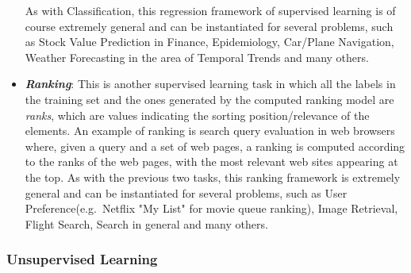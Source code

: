 \begin{itemize}
            As with Classification, this regression framework of
            supervised learning is of course extremely general
            and can be instantiated for several problems, such as
            Stock Value Prediction in Finance, Epidemiology, Car/Plane
            Navigation, Weather Forecasting in the area of Temporal
            Trends and many others.

      \item \emph{\textbf{Ranking}}: This is another supervised learning
            task in which all the labels in the training set and the ones
            generated by the computed ranking model are \emph{ranks},
            which are values indicating the sorting position/relevance
            of the elements. An example of ranking is search query
            evaluation in web browsers where, given a query and a set of
            web pages, a ranking is computed according to the ranks of
            the web pages, with the most relevant web sites appearing at
            the top. As with the previous two tasks, this ranking
            framework is extremely general and can be instantiated for
            several problems, such as User Preference(e.g.\ Netflix
            "My List" for movie queue ranking), Image Retrieval, Flight
            Search, Search in general and many others.
\end{itemize}

\newpage

\subsubsection{Unsupervised Learning}